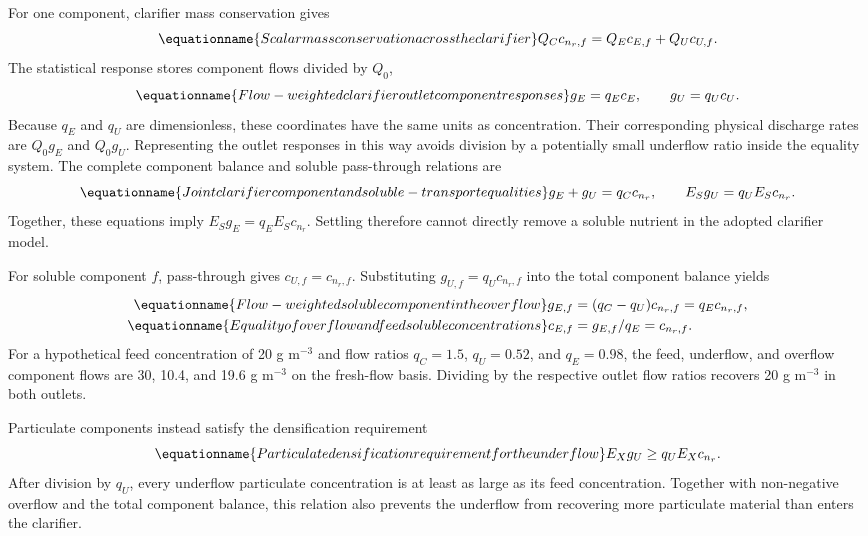 For one component, clarifier mass conservation gives
\begin{equation}
\equationname{Scalar mass conservation across the clarifier}
Q_Cc_{n_r,f}=Q_Ec_{E,f}+Q_Uc_{U,f}.
\end{equation}
The statistical response stores component flows divided by $Q_0$,
\begin{equation}
\equationname{Flow-weighted clarifier outlet component responses}
g_E=q_Ec_E,\qquad g_U=q_Uc_U.
\label{eq:plant_outlet_flows}
\end{equation}
Because $q_E$ and $q_U$ are dimensionless, these coordinates have the same units as concentration. Their corresponding physical discharge rates are $Q_0g_E$ and $Q_0g_U$. Representing the outlet responses in this way avoids division by a potentially small underflow ratio inside the equality system. The complete component balance and soluble pass-through relations are
\begin{equation}
\equationname{Joint clarifier component and soluble-transport equalities}
g_E+g_U=q_Cc_{n_r},\qquad
E_Sg_U=q_UE_Sc_{n_r}.
\label{eq:plant_clarifier_equalities}
\end{equation}
Together, these equations imply $E_Sg_E=q_EE_Sc_{n_r}$. Settling therefore cannot directly remove a soluble nutrient in the adopted clarifier model.

For soluble component $f$, pass-through gives $c_{U,f}=c_{n_r,f}$. Substituting $g_{U,f}=q_Uc_{n_r,f}$ into the total component balance yields
\begin{align}
\equationname{Flow-weighted soluble component in the overflow}
g_{E,f}&=(q_C-q_U)c_{n_r,f}=q_Ec_{n_r,f},\\
\equationname{Equality of overflow and feed soluble concentrations}
c_{E,f}&=g_{E,f}/q_E=c_{n_r,f}.
\end{align}
For a hypothetical feed concentration of 20 g m$^{-3}$ and flow ratios $q_C=1.5$, $q_U=0.52$, and $q_E=0.98$, the feed, underflow, and overflow component flows are 30, 10.4, and 19.6 g m$^{-3}$ on the fresh-flow basis. Dividing by the respective outlet flow ratios recovers 20 g m$^{-3}$ in both outlets.

Particulate components instead satisfy the densification requirement
\begin{equation}
\equationname{Particulate densification requirement for the underflow}
E_Xg_U\ge q_UE_Xc_{n_r}.
\label{eq:plant_densification}
\end{equation}
After division by $q_U$, every underflow particulate concentration is at least as large as its feed concentration. Together with non-negative overflow and the total component balance, this relation also prevents the underflow from recovering more particulate material than enters the clarifier.

